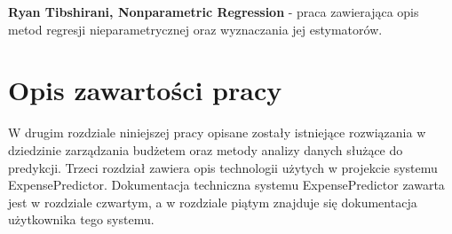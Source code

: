\textbf{Ryan Tibshirani, Nonparametric Regression} - praca zawierająca opis metod regresji nieparametrycznej oraz wyznaczania jej estymatorów.
\section{Opis zawartości pracy}
W drugim rozdziale niniejszej pracy opisane zostały istniejące rozwiązania w dziedzinie zarządzania budżetem oraz metody analizy danych służące do predykcji. Trzeci rozdział zawiera opis technologii użytych w projekcie systemu ExpensePredictor. Dokumentacja techniczna systemu ExpensePredictor zawarta jest w rozdziale czwartym, a w rozdziale piątym znajduje się dokumentacja użytkownika tego systemu.